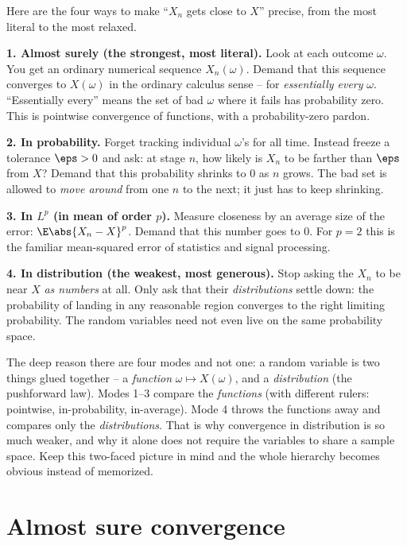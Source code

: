 Here are the four ways to make ``$X_n$ gets close to $X$'' precise, from the most
literal to the most relaxed.

\textbf{1. Almost surely (the strongest, most literal).} Look at each outcome
$\omega$. You get an ordinary numerical sequence $X_n(\omega)$. Demand that this
sequence converges to $X(\omega)$ in the ordinary calculus sense -- for
\emph{essentially every} $\omega$. ``Essentially every'' means the set of bad
$\omega$ where it fails has probability zero. This is pointwise convergence of
functions, with a probability-zero pardon.

\textbf{2. In probability.} Forget tracking individual $\omega$'s for all time.
Instead freeze a tolerance $\eps > 0$ and ask: at stage $n$, how likely is $X_n$ to be
farther than $\eps$ from $X$? Demand that this probability shrinks to $0$ as $n$ grows.
The bad set is allowed to \emph{move around} from one $n$ to the next; it just has to
keep shrinking.

\textbf{3. In $L^p$ (in mean of order $p$).} Measure closeness by an average size of
the error: $\E\abs{X_n - X}^p$. Demand that this number goes to $0$. For $p=2$ this
is the familiar mean-squared error of statistics and signal processing.

\textbf{4. In distribution (the weakest, most generous).} Stop asking the $X_n$ to be
near $X$ \emph{as numbers} at all. Only ask that their \emph{distributions} settle
down: the probability of landing in any reasonable region converges to the right
limiting probability. The random variables need not even live on the same probability
space.

\begin{happeningbox}
The deep reason there are four modes and not one: a random variable is two things glued
together -- a \emph{function} $\omega \mapsto X(\omega)$, and a \emph{distribution}
(the pushforward law). Modes 1--3 compare the \emph{functions} (with different rulers:
pointwise, in-probability, in-average). Mode 4 throws the functions away and compares
only the \emph{distributions}. That is why convergence in distribution is so much
weaker, and why it alone does not require the variables to share a sample space. Keep
this two-faced picture in mind and the whole hierarchy becomes obvious instead of
memorized.
\end{happeningbox}

\section{Almost sure convergence}
\label{ch22:as}

